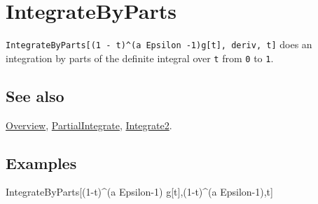 \documentclass[../FeynCalcManual.tex]{subfiles}
\begin{document}
\hypertarget{integratebyparts}{
\section{IntegrateByParts}\label{integratebyparts}}

\texttt{IntegrateByParts[\allowbreak{}(1 - t)^(a Epsilon -1)g[\allowbreak{}t],\ \allowbreak{}deriv,\ \allowbreak{}t]}
does an integration by parts of the definite integral over \texttt{t}
from \texttt{0} to \texttt{1}.

\subsection{See also}

\hyperlink{toc}{Overview},
\hyperlink{partialintegrate}{PartialIntegrate},
\hyperlink{integrate2}{Integrate2}.

\subsection{Examples}

IntegrateByParts{[}(1-t)\^{}(a Epsilon-1) g{[}t{]},(1-t)\^{}(a
Epsilon-1),t{]}
\end{document}
